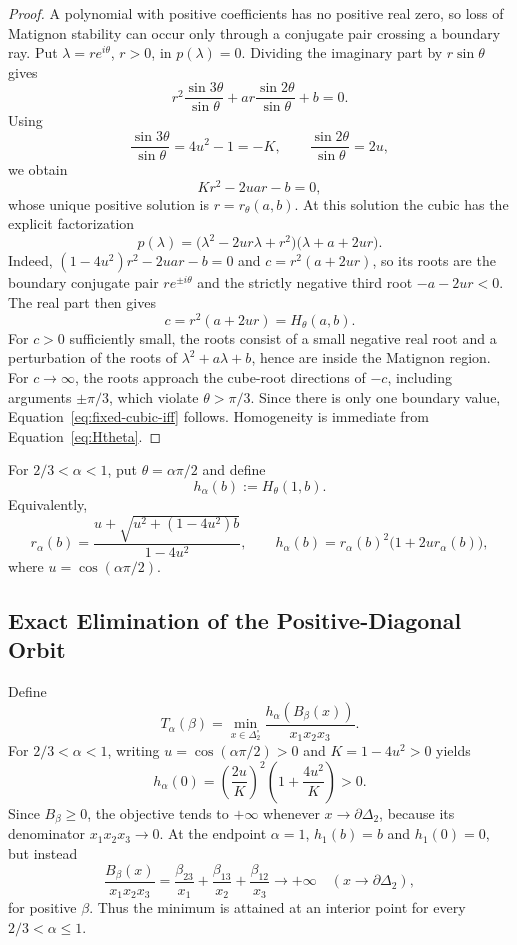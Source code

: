 \begin{proof}
A polynomial with positive coefficients has no positive real zero, so loss of Matignon stability can occur only through a conjugate pair crossing a boundary ray. Put \(\lambda=re^{i\theta}\), \(r>0\), in \(p(\lambda)=0\). Dividing the imaginary part by \(r\sin\theta\) gives
\[
r^2\frac{\sin3\theta}{\sin\theta}
+
ar\frac{\sin2\theta}{\sin\theta}
+b=0.
\]
Using
\[
\frac{\sin3\theta}{\sin\theta}=4u^2-1=-K,
\qquad
\frac{\sin2\theta}{\sin\theta}=2u,
\]
we obtain
\[
Kr^2-2uar-b=0,
\]
whose unique positive solution is \(r=r_\theta(a,b)\). At this solution the cubic has the explicit factorization
\[
 p(\lambda)=\bigl(\lambda^2-2ur\lambda+r^2\bigr)
 \bigl(\lambda+a+2ur\bigr).
\]
Indeed, \((1-4u^2)r^2-2uar-b=0\) and
\(c=r^2(a+2ur)\), so its roots are the boundary conjugate pair
\(re^{\pm i\theta}\) and the strictly negative third root
\(-a-2ur<0\). The real part then gives
\[
c=r^2(a+2ur)=H_\theta(a,b).
\]
For \(c>0\) sufficiently small, the roots consist of a small negative real root and a perturbation of the roots of \(\lambda^2+a\lambda+b\), hence are inside the Matignon region. For \(c\to\infty\), the roots approach the cube-root directions of \(-c\), including arguments \(\pm\pi/3\), which violate \(\theta>\pi/3\). Since there is only one boundary value, Equation~\eqref{eq:fixed-cubic-iff} follows. Homogeneity is immediate from Equation~\eqref{eq:Htheta}.
\end{proof}

For \(2/3<\alpha<1\), put \(\theta=\alpha\pi/2\) and define
\begin{equation}
h_\alpha(b):=H_\theta(1,b).
\end{equation}
Equivalently,
\begin{equation}
r_\alpha(b)
=
\frac{u+\sqrt{u^2+(1-4u^2)b}}{1-4u^2},
\qquad
h_\alpha(b)
=
r_\alpha(b)^2\bigl(1+2ur_\alpha(b)\bigr),
\label{eq:halpha}
\end{equation}
where \(u=\cos(\alpha\pi/2)\).

\subsection{Exact Elimination of the Positive-Diagonal Orbit}

Define
\begin{equation}
T_\alpha(\beta)
=
\min_{x\in\Delta_2^\circ}
\frac{h_\alpha(B_\beta(x))}{x_1x_2x_3}.
\label{eq:Talpha}
\end{equation}
For \(2/3<\alpha<1\), writing \(u=\cos(\alpha\pi/2)>0\) and \(K=1-4u^2>0\) yields
\[
 h_\alpha(0)=\left(\frac{2u}{K}\right)^2
 \left(1+\frac{4u^2}{K}\right)>0.
\]
Since \(B_\beta\ge0\), the objective tends to \(+\infty\) whenever
\(x\to\partial\Delta_2\), because its denominator
\(x_1x_2x_3\to0\). At the endpoint \(\alpha=1\),
\(h_1(b)=b\) and \(h_1(0)=0\), but instead
\[
 \frac{B_\beta(x)}{x_1x_2x_3}
 =\frac{\beta_{23}}{x_1}+
 \frac{\beta_{13}}{x_2}+
 \frac{\beta_{12}}{x_3}\longrightarrow+\infty
 \quad(x\to\partial\Delta_2),
\]
for positive \(\beta\). Thus the minimum is attained at an interior point for every \(2/3<\alpha\le1\).

